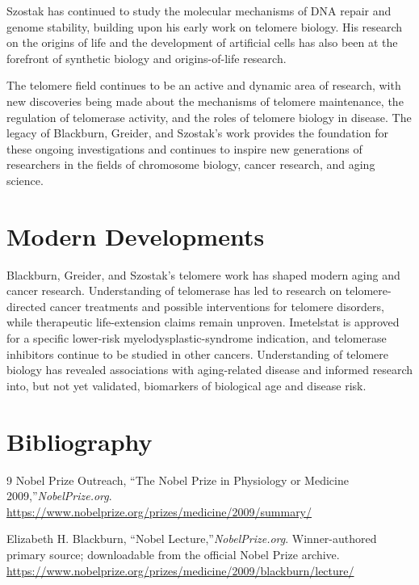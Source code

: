 Szostak has continued to study the molecular mechanisms of DNA repair and genome stability, building upon his early work on telomere biology. His research on the origins of life and the development of artificial cells has also been at the forefront of synthetic biology and origins-of-life research.

The telomere field continues to be an active and dynamic area of research, with new discoveries being made about the mechanisms of telomere maintenance, the regulation of telomerase activity, and the roles of telomere biology in disease. The legacy of Blackburn, Greider, and Szostak's work provides the foundation for these ongoing investigations and continues to inspire new generations of researchers in the fields of chromosome biology, cancer research, and aging science.


\section{Modern Developments}

Blackburn, Greider, and Szostak's telomere work has shaped modern aging and cancer research. Understanding of telomerase has led to research on telomere-directed cancer treatments and possible interventions for telomere disorders, while therapeutic life-extension claims remain unproven. Imetelstat is approved for a specific lower-risk myelodysplastic-syndrome indication, and telomerase inhibitors continue to be studied in other cancers. Understanding of telomere biology has revealed associations with aging-related disease and informed research into, but not yet validated, biomarkers of biological age and disease risk.


\section{Bibliography}

\begin{thebibliography}{9}
Nobel Prize Outreach, ``The Nobel Prize in Physiology or Medicine 2009,''\emph{NobelPrize.org}.\\
\url{https://www.nobelprize.org/prizes/medicine/2009/summary/}

Elizabeth H. Blackburn, ``Nobel Lecture,''\emph{NobelPrize.org}. Winner-authored primary source; downloadable from the official Nobel Prize archive.\\
\url{https://www.nobelprize.org/prizes/medicine/2009/blackburn/lecture/}
\end{thebibliography}
